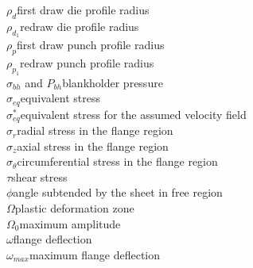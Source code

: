 \begin{tabbing}
             \>$\rho_d$\>\>\>\>\>first draw die profile radius\\
             \>$\rho_{d_1}$\>\>\>\>\>redraw die profile radius\\
             \>$\rho_p$\>\>\>\>\>first draw punch profile radius\\
             \>$\rho_{p_1}$\>\>\>\>\>redraw punch profile radius\\

             \>$\sigma_{bh}$ and $P_{bh}$\>\>\>\>\>blankholder pressure\\
             \>$\sigma_{eq}$\>\>\>\>\>equivalent stress \\
             \>$\sigma^{*}_{eq}$\>\>\>\>\>equivalent stress for the assumed velocity field\\
             \>$\sigma_r$\>\>\>\>\>radial stress in the flange region \\
             \>$\sigma_z$\>\>\>\>\>axial stress in the flange region\\
             \>$\sigma_{\theta}$\>\>\>\>\>circumferential stress in the flange region\\

             \>$\tau$\>\>\>\>\>shear stress\\

             \>$\phi$\>\>\>\>\>angle subtended by the sheet in free region \\

             \>$\Omega$\>\>\>\>\>plastic deformation zone\\
             \>$\Omega_0$\>\>\>\>\>maximum amplitude \\
             \>$\omega$\>\>\>\>\>flange deflection\\
             \>$\omega_{max}$\>\>\>\>\>maximum flange deflection \\



 \end{tabbing}
